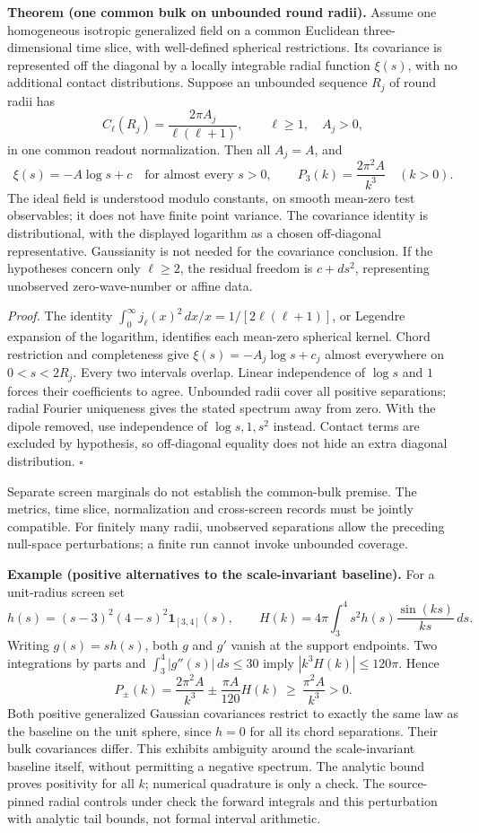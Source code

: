 \textbf{Theorem (one common bulk on unbounded round radii).}
\label{thm:common-bulk-unbounded-radii}
Assume one homogeneous isotropic generalized field on a common Euclidean
three-dimensional time slice, with well-defined spherical restrictions.
Its covariance is represented off the diagonal by a locally integrable
radial function \(\xi(s)\), with no additional contact distributions.
Suppose an unbounded sequence \(R_j\) of round radii has
\[
 C_\ell(R_j)=\frac{2\pi A_j}{\ell(\ell+1)},\qquad
 \ell\ge1,\quad A_j>0,
\]
in one common readout normalization. Then all \(A_j=A\), and
\[
 \xi(s)=-A\log s+c\quad\text{for almost every }s>0,\qquad
 P_3(k)=\frac{2\pi^2A}{k^3}\quad(k>0).
\]
The ideal field is understood modulo constants, on smooth mean-zero test
observables; it does not have finite point variance. The covariance
identity is distributional, with the displayed logarithm as a chosen
off-diagonal representative. Gaussianity is not
needed for the covariance conclusion. If the hypotheses concern only
\(\ell\ge2\), the residual freedom is \(c+ds^2\), representing
unobserved zero-wave-number or affine data.

\textit{Proof.}
The identity \(\int_0^\infty j_\ell(x)^2\,dx/x
=1/[2\ell(\ell+1)]\), or Legendre expansion of the logarithm, identifies
each mean-zero spherical kernel. Chord restriction and completeness give
\(\xi(s)=-A_j\log s+c_j\) almost everywhere on \(0<s<2R_j\).
Every two intervals overlap. Linear independence of \(\log s\) and
\(1\) forces their coefficients to agree. Unbounded radii cover all
positive separations; radial Fourier uniqueness gives the stated spectrum
away from zero. With the dipole removed, use independence of
\(\log s,1,s^2\) instead. Contact terms are excluded by hypothesis,
so off-diagonal equality does not hide an extra diagonal distribution.
\hfill\(\square\)

Separate screen marginals do not establish the common-bulk premise. The
metrics, time slice, normalization and cross-screen records must be jointly
compatible. For finitely many radii, unobserved separations allow
the preceding null-space perturbations; a finite run cannot invoke
unbounded coverage.

\textbf{Example (positive alternatives to the scale-invariant baseline).}
For a unit-radius screen set
\[
 h(s)=(s-3)^2(4-s)^2\mathbf1_{[3,4]}(s),\qquad
 H(k)=4\pi\int_3^4s^2h(s)\frac{\sin(ks)}{ks}\,ds.
\]
Writing \(g(s)=s h(s)\), both \(g\) and \(g'\) vanish at the support
endpoints. Two integrations by parts and
\(\int_3^4|g''(s)|\,ds\le30\) imply
\( |k^3H(k)|\le120\pi\). Hence
\[
 P_\pm(k)=\frac{2\pi^2A}{k^3}\pm\frac{\pi A}{120}H(k)
 \ \ge\ \frac{\pi^2A}{k^3}>0.
\]
Both positive generalized Gaussian covariances restrict to exactly the
same law as the baseline on the unit sphere, since \(h=0\) for all its
chord separations. Their bulk covariances differ. This exhibits ambiguity
around the scale-invariant baseline itself, without permitting a negative
spectrum. The analytic bound proves positivity for all \(k\); numerical
quadrature is only a check. The source-pinned radial controls under
check the forward integrals and this perturbation with analytic tail
bounds, not formal interval arithmetic.

